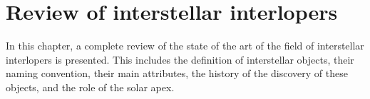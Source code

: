 \chapter{Review of interstellar interlopers}

In this chapter, a complete review of the state of the art of the field of
interstellar interlopers is presented. This includes the definition of
interstellar objects, their naming convention, their main attributes, the
history of the discovery of these objects, and the role of the solar apex.





